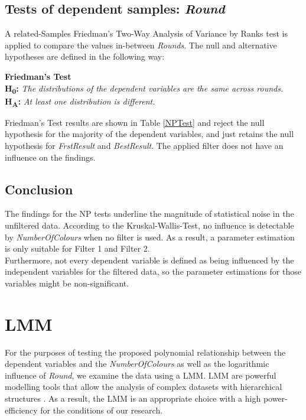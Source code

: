 \subsection{Tests of dependent samples: \textit{Round}}
A related-Samples Friedman's Two-Way Analysis of Variance by Ranks test \citep{Friedman1937} is applied to compare the values in-between \textit{Rounds}. The null and alternative hypotheses are defined in the following way:

\textbf{Friedman's Test} \\ 
\textbf{H\textsubscript{0}:} \textit{The distributions of the dependent variables are the same across rounds.}\\
\textbf{H\textsubscript{A}:} \textit{At least one distribution is different.}

Friedman's Test results are shown in Table \ref{NPTest} and reject the null hypothesis for the majority of the dependent variables, and just retains the null hypothesis for \textit{FrstResult} and \textit{BestResult}. The applied filter does not have an influence on the findings.

\subsection{Conclusion}
The findings for the \ac{NP} tests underline the magnitude of statistical noise in the unfiltered data. According to the Kruskal-Wallis-Test, no influence is detectable by \textit{NumberOfColours} when no filter is used. As a result, a parameter estimation is only suitable for Filter 1 and Filter 2.\\
Furthermore, not every dependent variable is defined as being influenced by the independent variables for the filtered data, so the parameter estimations for those variables might be non-significant.
\newpage
\section{\acf{LMM}}
\label{ch:Evaluation:sec:LMM}

For the purposes of testing the proposed polynomial relationship between the dependent variables and the \textit{NumberOfColours} as well as the logarithmic influence of \textit{Round}, we examine the data using a \acl{LMM}. \ac{LMM} are powerful modelling tools that allow the analysis of complex datasets with hierarchical structures \citep{Galecki2013}. As a result, the \acf{LMM} is an appropriate choice with a high power-efficiency for the conditions of our research.

